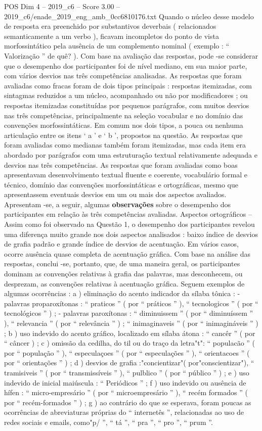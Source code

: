 \begin{textsample}{POS Dim 4 – 2019\_c6 – Score 3.00 – 2019\_c6/enade\_2019\_eng\_amb\_0cc6810176.txt}
Quando o núcleo desse modelo de resposta era preenchido por substantivos deverbais ( relacionados semanticamente a um verbo ), ficavam incompletos do ponto de vista morfossintático pela ausência de um complemento nominal ( exemplo : “ Valorização ” de quê? ).
Com base na avaliação das respostas, pode -se considerar que o desempenho dos participantes foi de nível mediano, em sua maior parte, com vários desvios nas três competências analisadas.
As respostas que foram avaliadas como fracas foram de dois tipos principais : respostas itemizadas, com sintagmas reduzidos a um núcleo, acompanhado ou não por modificadores ; ou respostas itemizadas constituídas por pequenos parágrafos, com muitos desvios nas três competências, principalmente na seleção vocabular e no domínio das convenções morfossintáticas.
Em comum nos dois tipos, a pouca ou nenhuma articulação entre os itens ‘ a ’ e ‘ b ’, propostos na questão.
As respostas que foram avaliadas como medianas também foram itemizadas, mas cada item era abordado por parágrafos com uma estruturação textual relativamente adequada e desvios nas três competências.
As respostas que foram avaliadas como boas apresentavam desenvolvimento textual fluente e coerente, vocabulário formal e técnico, domínio das convenções morfossintáticas e ortográficas, mesmo que apresentassem eventuais desvios em um ou mais dos aspectos avaliados.
Apresentam -se, a seguir, algumas \textbf{observações} sobre o desempenho dos participantes em relação às três competências avaliadas.
Aspectos ortográficos – Assim como foi observado na Questão 1, o desempenho dos participantes revelou uma diferença muito grande nos dois aspectos analisados : baixo índice de desvios de grafia padrão e grande índice de desvios de acentuação.
Em vários casos, ocorre ausência quase completa de acentuação gráfica.
Com base na análise das respostas, conclui -se, portanto, que, de uma maneira geral, os participantes dominam as convenções relativas à grafia das palavras, mas desconhecem, ou desprezam, as convenções relativas à acentuação gráfica.
Seguem exemplos de algumas ocorrências : a ) eliminação do acento indicador da sílaba tônica : - palavras proparoxítonas : “ praticos ” ( por “ práticos ” ), “ tecnologicos ” ( por “ tecnológicos ” ) ; - palavras paroxítonas : “ diminuissem ” ( por “ diminuíssem ” ), “ relevancia ” ( por “ relevância ” ) ; “ inimaginaveis ” ( por “ inimagináveis ” ) ; b ) uso indevido do acento gráfico, localizado em sílaba átona : “ cancêr ” ( por “ câncer ) ; c ) omissão da cedilha, do til ou do traço da letra"t": “ populacão ” ( por “ população ” ), “ especulaçoes ” ( por “ especulações ” ), “ orientacoes ” ( por “ orientações ” ) ; d ) desvios de grafia :"concientizar"( por"conscientizar"), “ tramisiveis ” ( por “ transmissíveis ” ), “ pulblico ” ( por “ público ” ) ; e ) uso indevido de inicial maiúscula : “ Periódicos ” ; f ) uso indevido ou ausência de hífen : “ micro-empresário ” ( por “ microempresário ” ), “ recém formados ” ( por “ recém-formados ” ) ; g ) ao contrário do que se esperava, foram poucas as ocorrências de abreviaturas próprias do “ internetês ”, relacionadas ao uso de redes sociais e emails, como"p/ ”, “ tá ”, “ pra ”, “ pro ”, “ prum ”.

\end{textsample}

